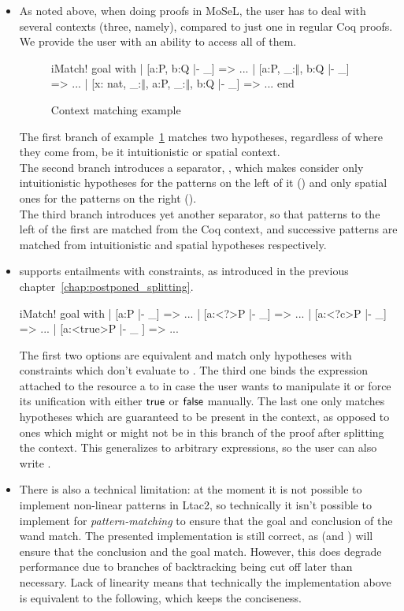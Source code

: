 \begin{itemize}
\item As noted above, when doing proofs in MoSeL, the user has to deal with several contexts (three, namely), compared to just one in regular Coq proofs.
  We provide the user with an ability to access all of them.
  \begin{figure}[H]
  \begin{coq}
       iMatch! goal with
       | [a:P, b:Q |- _] => ...
       | [a:P, _:$\Vert$, b:Q |- _] => ...
       | [x: nat, _:$\Vert$, a:P, _:$\Vert$, b:Q |- _] => ...
       end
   \end{coq}
   \caption{Context matching example}
   \label{fig:example:contex_matching}
  \end{figure}
  The first branch of example~\ref{fig:example:contex_matching} matches two hypotheses, regardless of where they come from, be it intuitionistic or spatial context.\\
  The second branch introduces a separator, \coqe{_:$\Vert$}, which makes  consider only intuitionistic hypotheses for the patterns on the left of it () and only spatial ones for the patterns on the right ().\\
  The third branch introduces yet another separator, so that patterns to the left of the first \coqe{_:$\Vert$} are matched from the Coq context, and successive patterns are matched from intuitionistic and spatial hypotheses respectively.

\item {} supports entailments with constraints, as introduced in the previous chapter~\ref{chap:postponed_splitting}.
\begin{coq}
iMatch! goal with
| [a:P |- _] => ...
| [a:<?>P |- _] => ...
| [a:<?c>P |- _] => ...
| [a:<true>P |- _ ] => ...
\end{coq}
The first two options are equivalent and match only hypotheses with constraints which don't evaluate to \false.
The third one binds the expression attached to the resource a to  in case the user wants to manipulate it or force its unification with either $\textsf{true}$ or $\textsf{false}$ manually.
The last one only matches hypotheses which are guaranteed to be present in the context, as opposed to ones which might or might not be in this branch of the proof after splitting the context.
This generalizes to arbitrary expressions, so the user can also write .
\item There is also a technical limitation: at the moment it is not possible to implement non-linear patterns in Ltac2, so technically it isn't possible to implement  for \emph{pattern-matching} to ensure that the goal and conclusion of the wand match.
  The presented implementation is still correct, as  (and ) will ensure that the conclusion and the goal match.
  However, this does degrade performance due to branches of backtracking being cut off later than necessary.
  Lack of linearity means that technically the implementation above is equivalent to the following, which keeps the conciseness.


\end{itemize}
